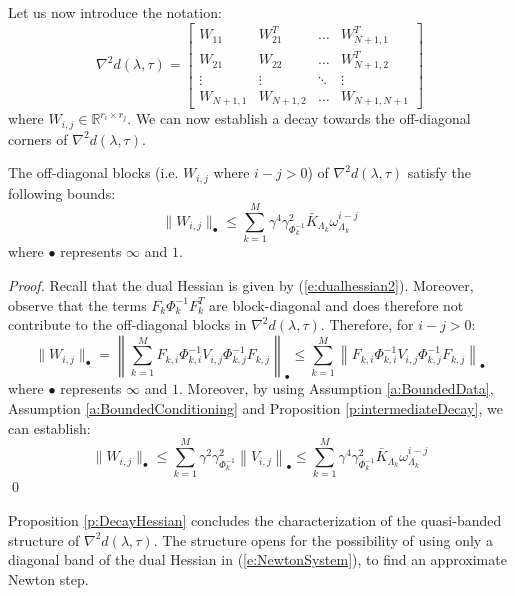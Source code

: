 Let us now introduce the notation:
\begin{equation} \label{e:HessianBlocks}
\nabla^2 d(\lambda, \tau) = \left[ \begin{array}{cccc}
W_{11} & W_{21}^T & \hdots & W_{N+1,1}^T \\
W_{21} & W_{22} & \hdots & W_{N+1,2}^T \\
\vdots & \vdots  & \ddots & \vdots \\
W_{N+1,1} & W_{N+1,2} & \hdots & W_{N+1,N+1}
\end{array} \right]
\end{equation}
where $W_{i,j} \in \mathbb{R}^{r_i \times r_j}$. We can now establish a decay towards the off-diagonal corners of $\nabla^2 d(\lambda, \tau)$.

\begin{proposition} \label{p:DecayHessian}
The off-diagonal blocks (i.e. $W_{i,j}$ where $i - j > 0$) of $\nabla^2 d(\lambda, \tau)$ satisfy the following bounds:
\begin{equation}
\label{e:DecayHessian}
\| W_{i,j} \|_\bullet \leq \sum_{k=1}^M \gamma^4 \gamma_{\Phi_k^{-1}}^2 \bar{K}_{\Lambda_k} \omega_{\Lambda_k}^{i-j} 
\end{equation}
where $\bullet$ represents $\infty$ and $1$.
\end{proposition}
\begin{proof}
Recall that the dual Hessian is given by (\ref{e:dualhessian2}). Moreover, observe that the terms $F_k \Phi_k^{-1} F_k^T$ are block-diagonal and does therefore not contribute to the off-diagonal blocks in $\nabla^2 d(\lambda, \tau)$. Therefore, for $i - j > 0$:
\begin{equation}
\| W_{i,j} \|_\bullet = \left\| \sum_{k=1}^M F_{k,i} \Phi_{k,i}^{-1} V_{i,j} \Phi_{k,j}^{-1} F_{k,j} \right\|_\bullet \leq \sum_{k=1}^M \left\| F_{k,i} \Phi_{k,i}^{-1} V_{i,j} \Phi_{k,j}^{-1} F_{k,j} \right\|_\bullet
\end{equation}
where $\bullet$ represents $\infty$ and $1$. Moreover, by using Assumption \ref{a:BoundedData}, Assumption \ref{a:BoundedConditioning} and Proposition \ref{p:intermediateDecay}, we can establish:
\begin{equation}
\| W_{i,j} \|_\bullet \leq \sum_{k=1}^M \gamma^2 \gamma_{\Phi_k^{-1}}^2 \left\| V_{i,j} \right\|_\bullet \leq \sum_{k=1}^M \gamma^4 \gamma_{\Phi_k^{-1}}^2 \bar{K}_{\Lambda_k} \omega_{\Lambda_k}^{i-j}
\end{equation}
\qed
\end{proof}
Proposition \ref{p:DecayHessian} concludes the characterization of the quasi-banded structure of $\nabla^2 d(\lambda,\tau)$. The structure opens for the possibility of using only a diagonal band of the dual Hessian in (\ref{e:NewtonSystem}), to find an approximate Newton step.


